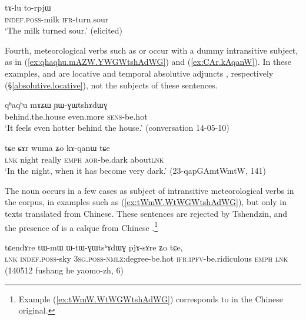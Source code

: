 \begin{exe}
\ex   \label{ex:tAlu.torpjW}
\gll    tɤ-lu to-rpjɯ \\
\textsc{indef}.\textsc{poss}-milk \textsc{ifr}-turn.sour \\
\glt `The milk turned sour.' (elicited)
\end{exe}

Fourth, meteorological verbs such as  or  occur with a dummy intransitive subject, as in (\ref{ex:qhaqhu.mAZW.YWGWtshAdWG}) and (\ref{ex:CAr.kAqanW}). In these examples,  and  are locative and temporal absolutive adjuncts , respectively (§\ref{absolutive.locative}), not the subjects of these sentences.

\begin{exe}
\ex   \label{ex:qhaqhu.mAZW.YWGWtshAdWG}
\gll qʰaqʰu mɤʑɯ ɲɯ-ɣɯtshɤdɯɣ \\
behind.the.house even.more \textsc{sens}-be.hot \\
\glt `It feels even hotter behind the house.' (conversation 14-05-10)
\end{exe}

\begin{exe}
\ex   \label{ex:CAr.kAqanW}
\gll  tɕe ɕɤr wuma ʑo kɤ-qanɯ tɕe \\
\textsc{lnk} night really \textsc{emph} \textsc{aor}-be.dark about\textsc{lnk} \\
\glt `In the night, when it has become very dark.' (23-qapGAmtWmtW, 141)
\end{exe}

The noun  occurs in a few cases as subject of intransitive meteorological verbs in the corpus, in examples such as (\ref{ex:tWmW.WtWGWtshAdWG}), but only in texts translated from Chinese. These sentences are rejected by Tshendzin, and the presence of  is a calque from Chinese .\footnote{Example (\ref{ex:tWmW.WtWGWtshAdWG}) corresponds to  in the Chinese original.}

\begin{exe}
\ex   \label{ex:tWmW.WtWGWtshAdWG}
\gll tɕendɤre tɯ-mɯ ɯ-tɯ-ɣɯtsʰɤdɯɣ pjɤ-sɤre ʑo tɕe, \\
\textsc{lnk} \textsc{indef}.\textsc{poss}-sky \textsc{3sg}.\textsc{poss}-\textsc{nmlz}:degree-be.hot \textsc{ifr}.\textsc{ipfv}-be.ridiculous \textsc{emph} \textsc{lnk} \\
\glt (140512 fushang he yaomo-zh, 6)
\end{exe}

